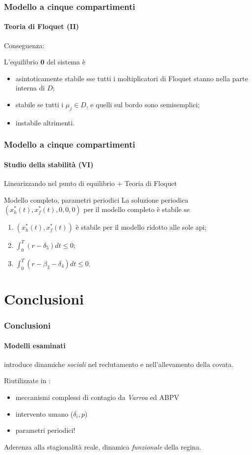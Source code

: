\documentclass[]{beamer}
\begin{document}
\begin{frame}
    \frametitle{Modello a cinque compartimenti}
    \framesubtitle{Teoria di Floquet (II)}

    Conseguenza:

    L'equilibrio $\mathbf{0}$ del sistema è
    \begin{itemize}
        \item \pause asintoticamente stabile sse tutti i moltiplicatori di Floquet stanno nella
        parte interna di $D$;
        \item \pause stabile se tutti i $\mu_j \in D$, e quelli sul bordo sono semisemplici;
        \item \pause instabile altrimenti.
    \end{itemize}
\end{frame}

\begin{frame}
    \frametitle{Modello a cinque compartimenti}
    \framesubtitle{Studio della stabilità (VI)}

    Linearizzando nel punto di equilibrio + Teoria di Floquet

    \begin{exampleblock}{Modello completo, parametri periodici}
        La soluzione periodica $\left( x_h^*(t), x_f^*(t), 0, 0, 0 \right)$
        \pause per il modello completo è stabile se
        \begin{enumerate}
            \item \pause $\left( x_h^*(t), x_f^*(t) \right)$ è stabile per il modello ridotto alle sole api;
            \item \pause $\int_0^T (r - \delta_5) dt \leq 0$;
            \item \pause $\int_0^T (r -\beta_3 - \delta_4) dt \leq 0$.
        \end{enumerate}
    \end{exampleblock}
\end{frame}


\section{Conclusioni}


\begin{frame}
    \frametitle{Conclusioni}
    \framesubtitle{Modelli esaminati}

    \cite{khoury2011} introduce dinamiche \emph{sociali} nel reclutamento e nell'allevamento della covata.

    \pause
    \vspace{1em}
    Riutilizzate in \cite{ratti2017}:
    \begin{itemize}
        \item \pause meccanismi complessi di contagio da \emph{Varroa} ed ABPV
        \item \pause intervento umano ($\delta_i, p$)
        \item \pause parametri periodici!
    \end{itemize}

    Aderenza alla stagionalità reale, \pause dinamica \emph{funzionale} della regina.
\end{frame}
\end{document}
